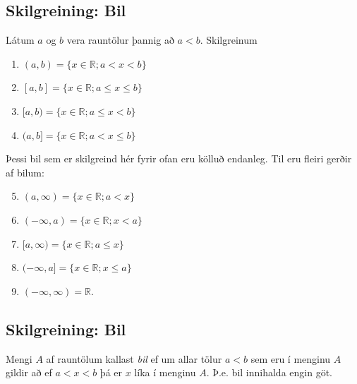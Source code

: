 \documentclass[b5paper,10pt,icelandic]{sphinxmanual}
\begin{document}
\subsection{Skilgreining: Bil}
\label{\detokenize{kafli01:skilgreining-bil}}\label{\detokenize{kafli01:index-2}}
Látum \(a\) og \(b\) vera rauntölur þannig að
\(a<b\). Skilgreinum
\begin{enumerate}
\item {} 
 \((a,b)=\{x\in \mathbb{R}; a<x<b\}\)

\item {} 
 \([a,b]=\{x\in \mathbb{R}; a\leq x\leq b\}\)

\item {} 
 \([a,b)=\{x\in \mathbb{R}; a\leq x<b\}\)

\item {} 
 \((a,b]=\{x\in \mathbb{R}; a< x\leq b\}\)

\end{enumerate}

Þessi bil sem er skilgreind hér fyrir ofan eru kölluð endanleg. Til eru
fleiri gerðir af bilum:
\begin{enumerate}
\setcounter{enumi}{4}
\item {} 
 \((a,\infty)=\{x\in \mathbb{R}; a<x\}\)

\item {} 
 \((-\infty, a)=\{x\in \mathbb{R}; x<a\}\)

\item {} 
 \([a,\infty)=\{x\in \mathbb{R}; a\leq x\}\)

\item {} 
 \((-\infty, a]=\{x\in \mathbb{R}; x\leq a\}\)

\item {} 
 \((-\infty, \infty)= \mathbb{R}\).

\end{enumerate}


\subsection{Skilgreining: Bil}
\label{\detokenize{kafli01:id1}}
Mengi \(A\) af rauntölum kallast \textit{bil} ef um allar
tölur \(a<b\) sem eru í menginu \(A\) gildir að ef \(a<x<b\)
þá er \(x\) líka í menginu \(A\). Þ.e. bil innihalda engin göt.
\end{document}
